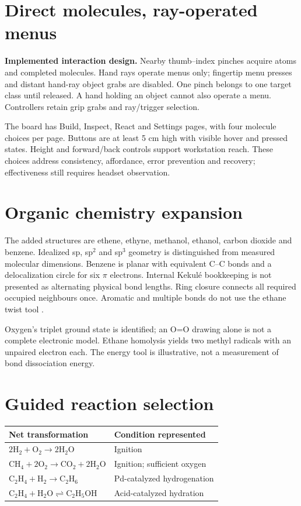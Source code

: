 \section*{Direct molecules, ray-operated menus}
\textbf{Implemented interaction design.} Nearby thumb--index pinches acquire atoms and completed molecules. Hand rays operate menus only; fingertip menu presses and distant hand-ray object grabs are disabled. One pinch belongs to one target class until released. A hand holding an object cannot also operate a menu. Controllers retain grip grabs and ray/trigger selection.

The board has Build, Inspect, React and Settings pages, with four molecule choices per page. Buttons are at least 5 cm high with visible hover and pressed states. Height and forward/back controls support workstation reach. These choices address consistency, affordance, error prevention and recovery; effectiveness still requires headset observation.

\section*{Organic chemistry expansion}
The added structures are ethene, ethyne, methanol, ethanol, carbon dioxide and benzene. Idealized sp, sp$^2$ and sp$^3$ geometry is distinguished from measured molecular dimensions. Benzene is planar with equivalent C--C bonds and a delocalization circle for six $\pi$ electrons. Internal Kekul\'e bookkeeping is not presented as alternating physical bond lengths. Ring closure connects all required occupied neighbours once. Aromatic and multiple bonds do not use the ethane twist tool \cite{benzene}.

Oxygen's triplet ground state is identified; an O=O drawing alone is not a complete electronic model. Ethane homolysis yields two methyl radicals with an unpaired electron each. The energy tool is illustrative, not a measurement of bond dissociation energy.

\section*{Guided reaction selection}
\begin{tabularx}{\linewidth}{@{}YY@{}}\toprule
Net transformation & Condition represented\\\midrule
$2\mathrm{H}_2+\mathrm{O}_2\rightarrow2\mathrm{H}_2\mathrm{O}$ & Ignition\\
$\mathrm{CH}_4+2\mathrm{O}_2\rightarrow\mathrm{CO}_2+2\mathrm{H}_2\mathrm{O}$ & Ignition; sufficient oxygen\\
$\mathrm{C}_2\mathrm{H}_4+\mathrm{H}_2\rightarrow\mathrm{C}_2\mathrm{H}_6$ & Pd-catalyzed hydrogenation\\
$\mathrm{C}_2\mathrm{H}_4+\mathrm{H}_2\mathrm{O}\rightleftharpoons\mathrm{C}_2\mathrm{H}_5\mathrm{OH}$ & Acid-catalyzed hydration\\\bottomrule
\end{tabularx}

